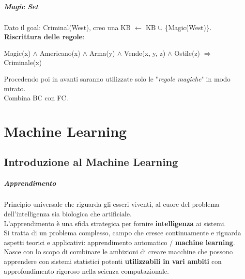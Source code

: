 \documentclass[10pt]{book}
\begin{document}
\paragraph{\textit{Magic Set}} Dato il goal: Criminal(West), creo una KB $\leftarrow$ KB $\cup$ \{Magic(West)\}. \textbf{Riscrittura delle regole}:
\begin{list}{}{}
	\item Magic(x) $\wedge$ Americano(x) $\wedge$ Arma(y) $\wedge$ Vende(x, y, z) $\wedge$ Ostile(z) $\Rightarrow$ Criminale(x)
\end{list}
Procedendo poi in avanti saranno utilizzate solo le "\textit{regole magiche}" in modo mirato.\\
Combina BC con FC.
\chapter{Machine Learning}
\section{Introduzione al Machine Learning}
\paragraph{Apprendimento} Principio universale che riguarda gli esseri viventi, al cuore del problema dell'intelligenza sia biologica che artificiale.\\
L'apprendimento è una sfida strategica per fornire \textbf{intelligenza} ai sistemi.\\
Si tratta di un problema complesso, campo che cresce continuamente e riguarda aspetti teorici e applicativi: apprendimento automatico / \textbf{machine learning}.\\
Nasce con lo scopo di combinare le ambizioni di creare macchine che possono apprendere con sistemi statistici potenti \textbf{utilizzabili in vari ambiti} con approfondimento rigoroso nella scienza computazionale.
\end{document}
